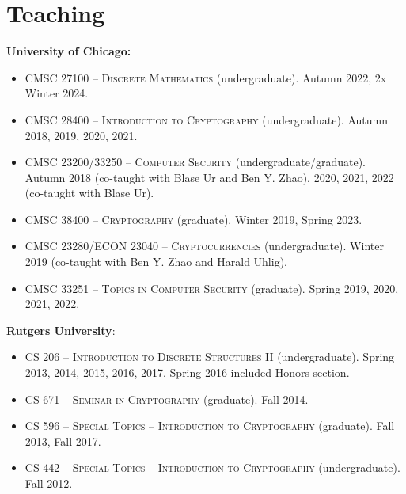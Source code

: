 
\section*{Teaching}

\noindent\textbf{University of Chicago:}
\begin{itemize}
\item \textsc{CMSC 27100 -- Discrete Mathematics} (undergraduate).
    Autumn 2022, 2x Winter 2024.
\item \textsc{CMSC 28400 -- Introduction to Cryptography} (undergraduate).
    Autumn 2018, 2019, 2020, 2021.
\item \textsc{CMSC 23200/33250 -- Computer Security} (undergraduate/graduate).
    Autumn 2018 (co-taught with Blase Ur and Ben Y. Zhao), 2020,
    2021, 2022
    (co-taught with Blase Ur).
\item \textsc{CMSC 38400 -- Cryptography} (graduate).
    Winter 2019, Spring 2023.
\item \textsc{CMSC 23280/ECON 23040 -- Cryptocurrencies} (undergraduate).
    Winter 2019 (co-taught with Ben Y. Zhao and Harald Uhlig).
\item \textsc{CMSC 33251 -- Topics in Computer Security} (graduate). Spring 2019, 2020,
    2021, 2022.

\end{itemize}

\noindent\textbf{Rutgers University}:
\begin{itemize}

\item \textsc{CS 206 -- Introduction to Discrete Structures II} (undergraduate).
Spring 2013, 2014, 2015, 2016, 2017.  Spring 2016 included Honors section.

\item \textsc{CS 671 -- Seminar in Cryptography} (graduate). Fall 2014.

\item \textsc{CS 596 -- Special Topics -- Introduction to Cryptography} (graduate). Fall 2013, Fall 2017.

\item \textsc{CS 442 -- Special Topics -- Introduction to Cryptography} (undergraduate). Fall 2012.

\end{itemize}

